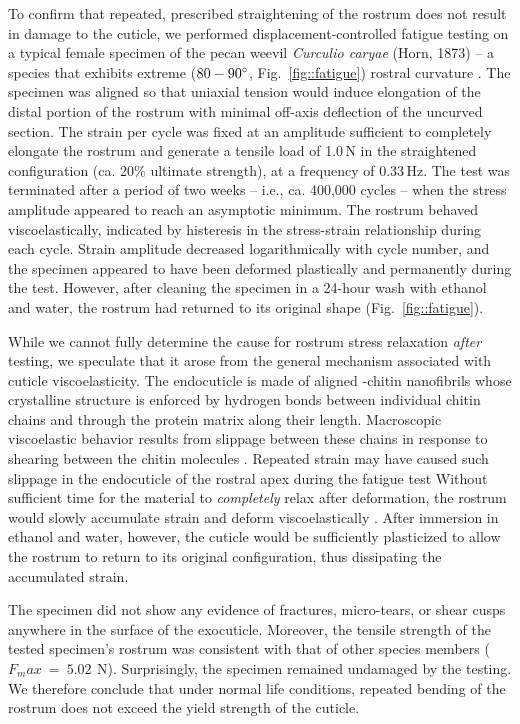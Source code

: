 \documentclass[twocolumn, linenumbers, superscriptaddress, nofootinbib]{revtex4-1}
\begin{document}
		To confirm that repeated, prescribed straightening of the rostrum does not result in damage to the cuticle, we performed displacement-controlled fatigue testing on a typical female specimen of the pecan weevil \textit{Curculio caryae} (Horn, 1873) -- a species that exhibits extreme ($80-90\degree$, Fig.~\ref{fig::fatigue}) rostral curvature \cite{AguirreUribe1978, Gibson1969}.
		The specimen was aligned so that uniaxial tension would induce elongation of the distal portion of the rostrum with minimal off-axis deflection of the uncurved section.
		The strain per cycle was fixed at an amplitude sufficient to completely elongate the rostrum and generate a tensile load of 1.0\,N  in the straightened configuration (ca. 20\% ultimate strength), at a frequency of $0.33\,\text{Hz}$.
		The test was terminated after a period of two weeks -- i.e., ca. 400,000 cycles -- when the stress amplitude appeared to reach an asymptotic minimum.		
		The rostrum behaved viscoelastically, indicated by histeresis in the stress-strain relationship during each cycle.
		Strain amplitude decreased logarithmically with cycle number, and the specimen appeared to have been deformed plastically and permanently during the test.
		However, after cleaning the specimen in a 24-hour wash with ethanol and water, the rostrum had returned to its original shape (Fig.~\ref{fig::fatigue}).
		
		While we cannot fully determine the cause for rostrum stress relaxation \emph{after} testing, we speculate that it arose from the general mechanism associated with cuticle viscoelasticity.
		The endocuticle is made of aligned \textalpha-chitin nanofibrils whose crystalline structure is enforced by hydrogen bonds between individual chitin chains and through the protein matrix along their length.
		Macroscopic viscoelastic behavior results from slippage between these chains in response to shearing between the chitin molecules \cite{Vincent2004, Evans1967, Sun2012}.
		Repeated strain may have caused such slippage in the endocuticle of the rostral apex during the fatigue test
		Without sufficient time for the material to \textit{completely} relax after deformation, the rostrum would slowly accumulate strain and deform viscoelastically \cite{Munster2013}.
		After immersion in ethanol and water, however, the cuticle would be sufficiently plasticized to allow the rostrum to return to its original configuration, thus dissipating the accumulated strain.
		
		The specimen did not show any evidence of fractures, micro-tears, or shear cusps anywhere in the surface of the exocuticle.
		Moreover, the tensile strength of the tested specimen's rostrum was consistent with that of other species members ($F_max~=~5.02~\,\text{N}$).
		Surprisingly, the specimen remained undamaged by the testing.
		We therefore conclude that under normal life conditions, repeated bending of the rostrum does not exceed the yield strength of the cuticle.
			
\end{document}
